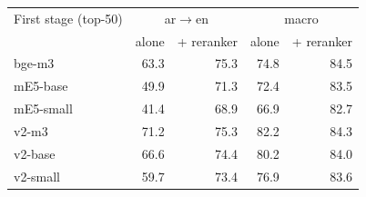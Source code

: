 \begin{tabular}{@{}lrrrr@{}}
\toprule
First stage (top-50) & \multicolumn{2}{c}{ar$\to$en} & \multicolumn{2}{c}{macro} \\
 & alone & + reranker & alone & + reranker \\
\midrule
bge-m3 & 63.3 & 75.3 & 74.8 & 84.5 \\
mE5-base & 49.9 & 71.3 & 72.4 & 83.5 \\
mE5-small & 41.4 & 68.9 & 66.9 & 82.7 \\
v2-m3 & 71.2 & 75.3 & 82.2 & 84.3 \\
v2-base & 66.6 & 74.4 & 80.2 & 84.0 \\
v2-small & 59.7 & 73.4 & 76.9 & 83.6 \\
\bottomrule
\end{tabular}
